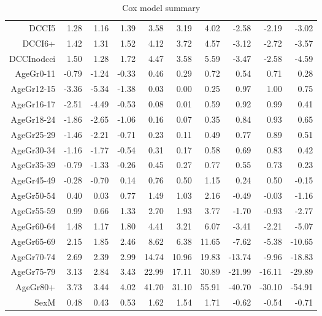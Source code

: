\begin{table}[ht]
\begin{tabular}{rrrrrrrrrr}
  DCCI5 & 1.28 & 1.16 & 1.39 & 3.58 & 3.19 & 4.02 & -2.58 & -2.19 & -3.02 \\ 
  DCCI6+ & 1.42 & 1.31 & 1.52 & 4.12 & 3.72 & 4.57 & -3.12 & -2.72 & -3.57 \\ 
  DCCInodcci & 1.50 & 1.28 & 1.72 & 4.47 & 3.58 & 5.59 & -3.47 & -2.58 & -4.59 \\ 
  AgeGr0-11 & -0.79 & -1.24 & -0.33 & 0.46 & 0.29 & 0.72 & 0.54 & 0.71 & 0.28 \\ 
  AgeGr12-15 & -3.36 & -5.34 & -1.38 & 0.03 & 0.00 & 0.25 & 0.97 & 1.00 & 0.75 \\ 
  AgeGr16-17 & -2.51 & -4.49 & -0.53 & 0.08 & 0.01 & 0.59 & 0.92 & 0.99 & 0.41 \\ 
  AgeGr18-24 & -1.86 & -2.65 & -1.06 & 0.16 & 0.07 & 0.35 & 0.84 & 0.93 & 0.65 \\ 
  AgeGr25-29 & -1.46 & -2.21 & -0.71 & 0.23 & 0.11 & 0.49 & 0.77 & 0.89 & 0.51 \\ 
  AgeGr30-34 & -1.16 & -1.77 & -0.54 & 0.31 & 0.17 & 0.58 & 0.69 & 0.83 & 0.42 \\ 
  AgeGr35-39 & -0.79 & -1.33 & -0.26 & 0.45 & 0.27 & 0.77 & 0.55 & 0.73 & 0.23 \\ 
  AgeGr45-49 & -0.28 & -0.70 & 0.14 & 0.76 & 0.50 & 1.15 & 0.24 & 0.50 & -0.15 \\ 
  AgeGr50-54 & 0.40 & 0.03 & 0.77 & 1.49 & 1.03 & 2.16 & -0.49 & -0.03 & -1.16 \\ 
  AgeGr55-59 & 0.99 & 0.66 & 1.33 & 2.70 & 1.93 & 3.77 & -1.70 & -0.93 & -2.77 \\ 
  AgeGr60-64 & 1.48 & 1.17 & 1.80 & 4.41 & 3.21 & 6.07 & -3.41 & -2.21 & -5.07 \\ 
  AgeGr65-69 & 2.15 & 1.85 & 2.46 & 8.62 & 6.38 & 11.65 & -7.62 & -5.38 & -10.65 \\ 
  AgeGr70-74 & 2.69 & 2.39 & 2.99 & 14.74 & 10.96 & 19.83 & -13.74 & -9.96 & -18.83 \\ 
  AgeGr75-79 & 3.13 & 2.84 & 3.43 & 22.99 & 17.11 & 30.89 & -21.99 & -16.11 & -29.89 \\ 
  AgeGr80+ & 3.73 & 3.44 & 4.02 & 41.70 & 31.10 & 55.91 & -40.70 & -30.10 & -54.91 \\ 
  SexM & 0.48 & 0.43 & 0.53 & 1.62 & 1.54 & 1.71 & -0.62 & -0.54 & -0.71 \\ 
   \hline
\end{tabular}
\caption{Cox model summary} 
\end{table}
